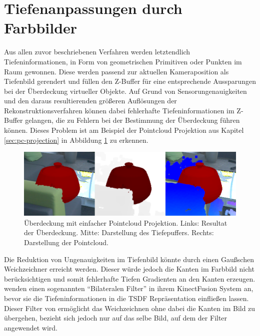 \section{Tiefenanpassungen durch Farbbilder}

Aus allen zuvor beschriebenen Verfahren werden letztendlich Tiefeninformationen, in Form von geometrischen Primitiven oder Punkten im Raum gewonnen. Diese werden passend zur aktuellen Kameraposition als Tiefenbild gerendert und füllen den Z-Buffer für eine entsprechende Aussparungen bei der Überdeckung virtueller Objekte. Auf Grund von Sensorungenauigkeiten und den daraus resultierenden größeren Auflösungen der Rekonstruktionsverfahren können dabei fehlerhafte Tiefeninformationen im Z-Buffer gelangen, die zu Fehlern bei der Bestimmung der Überdeckung führen können. Dieses Problem ist am Beispiel der Pointcloud Projektion aus Kapitel \ref{sec:pc-projection} in Abbildung \ref{fig:pc-noise} zu erkennen. \\

\begin{figure}[h]
  \centering
	\includegraphics[width=1.0\textwidth]{content/images/methods/pc-noise.png} 
  \caption{Überdeckung mit einfacher Pointcloud Projektion. Links: Resultat der Überdeckung. Mitte: Darstellung des Tiefepuffers. Rechts: Darstellung der Pointcloud.}
  \label{fig:pc-noise}
\end{figure}

Die Reduktion von Ungenauigkeiten im Tiefenbild könnte durch einen Gaußschen Weichzeichner erreicht werden. Dieser würde jedoch die Kanten im Farbbild nicht berücksichtigen und somit fehlerhafte Tiefen Gradienten an den Kanten erzeugen. \citet{newcombe2011kinectfusion} wenden einen sogenannten \enquote{Bilateralen Filter} in ihrem KinectFusion System an, bevor sie die Tiefeninformationen in die TSDF Repräsentation einfließen lassen. Dieser Filter von \citet{tomasi1998bilateral} ermöglicht das Weichzeichnen ohne dabei die Kanten im Bild zu übergehen, bezieht sich jedoch nur auf das selbe Bild, auf dem der Filter angewendet wird. \\

